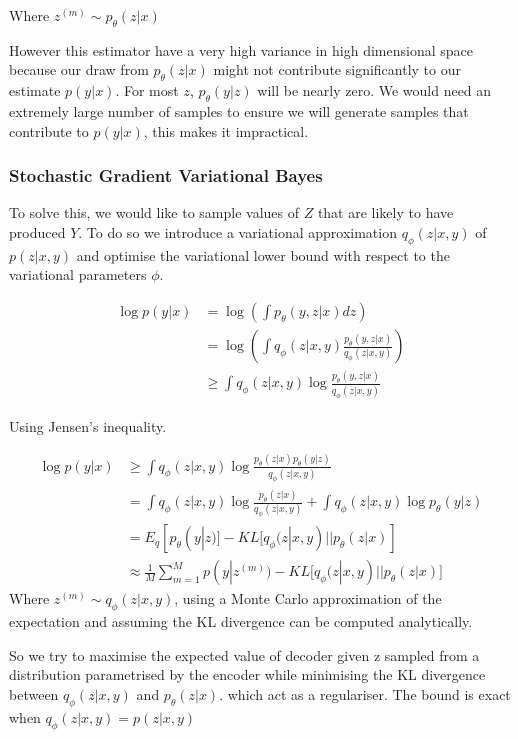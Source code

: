 \documentclass[10pt,oneside,openright]{report}
\begin{document}
Where $ z^{(m)} \sim p_\theta(z|x) $

However this estimator have a very high variance in high dimensional space because our draw from $p_\theta(z | x)$ might not contribute significantly to our estimate $p(y |x)$. For most $z$, $p_\theta(y|z)$ will be nearly zero. We would need an extremely large number of samples to ensure we will generate samples that contribute to $p(y|x)$, this makes it impractical.

\subsubsection{Stochastic Gradient Variational Bayes}

To solve this, we would like to sample values of $Z$ that are likely to have produced $Y$. To do so we introduce a variational approximation $q_\phi(z|x, y)$ of $p(z|x, y)$ and optimise the variational lower bound with respect to the variational parameters $\phi$.
 
\begin{align}
 \log p(y|x) &= \log(\int p_\theta(y, z|x) dz) \\
 & =  \log(\int q_\phi(z|x, y) \frac{p_\theta(y, z|x)}{q_\phi(z|x, y)}) \\
 & \geq \int q_\phi(z|x, y) \log \frac{p_\theta(y, z|x)}{q_\phi(z|x, y)}
\end{align}

Using Jensen's inequality.

\begin{align}
 \log p(y|x) & \geq \int q_\phi(z|x, y) \log \frac{p_\theta(z|x) p_\theta(y| z)}{q_\phi(z|x, y)} \\
  &= \int q_\phi(z|x, y) \log \frac{p_\theta(z|x)}{q_\phi(z|x, y)}  + \int q_\phi(z|x, y) \log p_\theta(y|z) \\
  &= E_q[p_\theta(y|z)] - KL\big[q_\phi(z|x, y) || p_\theta(z|x)]\\
  &\approx  \frac{1}{M} \sum^M_{m=1} p(y | z^{(m)}) - KL\big[q_\phi(z|x, y) || p_\theta(z|x)\big]
\end{align}
Where $ z^{(m)} \sim q_\phi(z|x, y)$, using a Monte Carlo approximation of the expectation and assuming the KL divergence can be computed analytically.

So we try to maximise the expected value of decoder given z sampled from a distribution parametrised by the encoder while minimising the KL divergence between $q_\phi(z|x, y)$ and $p_\theta(z|x)$. which act as a regulariser. The bound is exact when $q_\phi(z| x, y) = p(z|x, y)$
\end{document}

